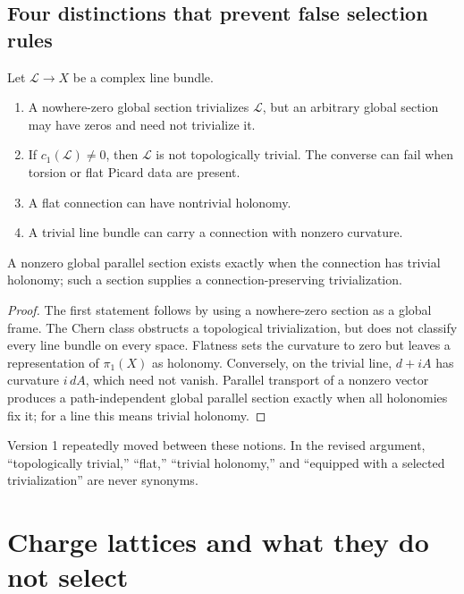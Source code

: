 \documentclass[11pt]{article}
\newcommand{\cOne}{c_1}
\newcommand{\Line}{\mathcal{L}}
\begin{document}
\subsection{Four distinctions that prevent false selection rules}

\begin{proposition}\label{prop:distinctions}
Let \(\Line\to X\) be a complex line bundle.
\begin{enumerate}
\item A nowhere-zero global section trivializes \(\Line\), but an arbitrary
global section may have zeros and need not trivialize it.
\item If \(\cOne(\Line)\ne0\), then \(\Line\) is not topologically trivial.
The converse can fail when torsion or flat Picard data are present.
\item A flat connection can have nontrivial holonomy.
\item A trivial line bundle can carry a connection with nonzero curvature.
\end{enumerate}
A nonzero global parallel section exists exactly when the connection has
trivial holonomy; such a section supplies a connection-preserving
trivialization.
\end{proposition}

\begin{proof}
The first statement follows by using a nowhere-zero section as a global
frame. The Chern class obstructs a topological trivialization, but does not
classify every line bundle on every space. Flatness sets the curvature to
zero but leaves a representation of \(\pi_1(X)\) as holonomy. Conversely, on
the trivial line, \(d+iA\) has curvature \(i\,dA\), which need not vanish.
Parallel transport of a nonzero vector produces a path-independent global
parallel section exactly when all holonomies fix it; for a line this means
trivial holonomy.
\end{proof}

\begin{remark}
Version 1 repeatedly moved between these notions. In the revised argument,
``topologically trivial,'' ``flat,'' ``trivial holonomy,'' and ``equipped
with a selected trivialization'' are never synonyms.
\end{remark}

\section{Charge lattices and what they do not select}
\end{document}
